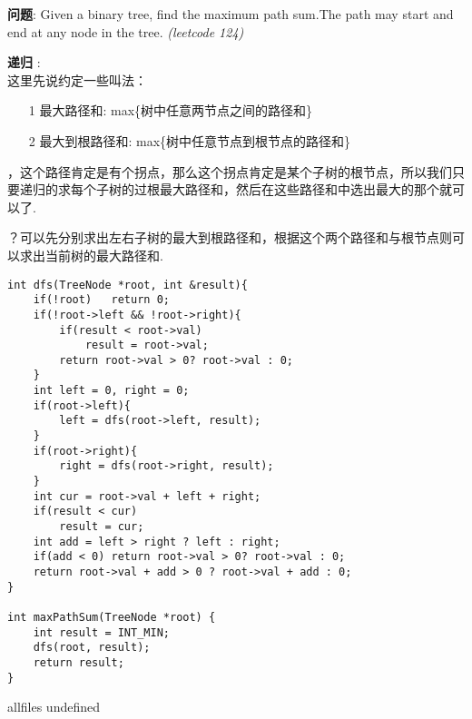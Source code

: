 \documentclass{article}
\begin{document}
\begin{CJK}{UTF8}{gbsn}     %

\else
	
\begin{description}
	\item{\textbf{问题}}: Given a binary tree, find the maximum path sum.The path may start and end at any node in the tree. \textit{(leetcode 124)}
	\item{\textbf{递归}} : 
	\\这里先说约定一些叫法：
	\begin{itemize}
	\item[1] 最大路径和: max\{树中任意两节点之间的路径和\}
	\item[2] 最大到根路径和: max\{树中任意节点到根节点的路径和\}
	\end{itemize}
	，这个路径肯定是有个拐点，那么这个拐点肯定是某个子树的根节点，所以我们只要递归的求每个子树的过根最大路径和，然后在这些路径和中选出最大的那个就可以了.
	
	？可以先分别求出左右子树的最大到根路径和，根据这个两个路径和与根节点则可以求出当前树的最大路径和.
	\begin{lstlisting}
int dfs(TreeNode *root, int &result){
	if(!root)	return 0;
	if(!root->left && !root->right){
		if(result < root->val)
			result = root->val;
		return root->val > 0? root->val : 0;
	}
	int left = 0, right = 0;
	if(root->left){
		left = dfs(root->left, result);
	}
	if(root->right){
		right = dfs(root->right, result);
	}
	int cur = root->val + left + right;
	if(result < cur)
		result = cur;
	int add = left > right ? left : right;
	if(add < 0)	return root->val > 0? root->val : 0;
	return root->val + add > 0 ? root->val + add : 0;
}

int maxPathSum(TreeNode *root) {
	int result = INT_MIN;
	dfs(root, result);
	return result;
}
	\end{lstlisting}
	\textit{}
\end{description}

\fi

\ifx allfiles undefined
\end{CJK}
\end{document}
